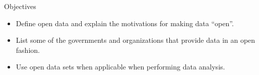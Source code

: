 \documentclass[xcolor=svgnames]{beamer}
\newcommand{\nl}{\\[1em]}
\begin{document}
\begin{frame}{Objectives}
\begin{itemize}
\item Define open data and explain the motivations for making data ``open''.\nl
\item List some of the governments and organizations that provide data in an open fashion.\nl
\item Use open data sets when applicable when performing data analysis.\nl
\end{itemize}
\end{frame}
\end{document}
